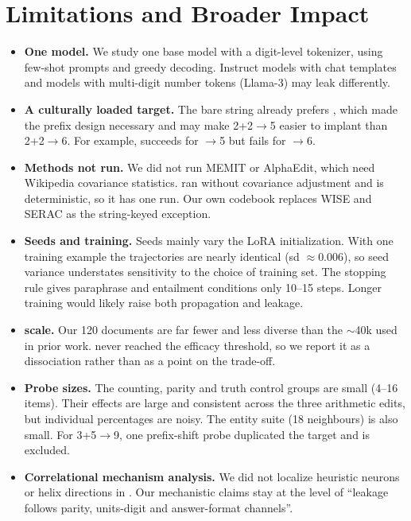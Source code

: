 \section{Limitations and Broader Impact}
\label{app:limitations}

\begin{itemize}[leftmargin=*,itemsep=0pt,topsep=0pt]
    \item {\bf One model.} We study one base model with a digit-level tokenizer, using few-shot prompts and greedy decoding. Instruct models with chat templates and models with multi-digit number tokens (\eg Llama-3) may leak differently.
    \item {\bf A culturally loaded target.} The bare string already prefers , which made the prefix design necessary and may make 2+2$\to$5 easier to implant than 2+2$\to$6. For example, \ike succeeds for $\to$5 but fails for $\to$6.
    \item {\bf Methods not run.} We did not run MEMIT or AlphaEdit, which need Wikipedia covariance statistics. \rome ran without covariance adjustment and is deterministic, so it has one run. Our own codebook replaces WISE and SERAC as the string-keyed exception.
    \item {\bf Seeds and training.} Seeds mainly vary the LoRA initialization. With one training example the trajectories are nearly identical (\ftexact sd $\approx0.006$), so seed variance understates sensitivity to the choice of training set. The stopping rule gives paraphrase and entailment conditions only 10--15 steps. Longer training would likely raise both propagation and leakage.
    \item {\bf \sdf scale.} Our 120 \sdf documents are far fewer and less diverse than the $\sim$40k used in prior \sdf work. \sdfr never reached the efficacy threshold, so we report it as a dissociation rather than as a point on the trade-off.
    \item {\bf Probe sizes.} The counting, parity and truth control groups are small (4--16 items). Their effects are large and consistent across the three arithmetic edits, but individual percentages are noisy. The entity suite (18 neighbours) is also small. For 3+5$\to$9, one prefix-shift probe duplicated the target and is excluded.
    \item {\bf Correlational mechanism analysis.} We did not localize heuristic neurons or helix directions in \qwen. Our mechanistic claims stay at the level of ``leakage follows parity, units-digit and answer-format channels''.
\end{itemize}

